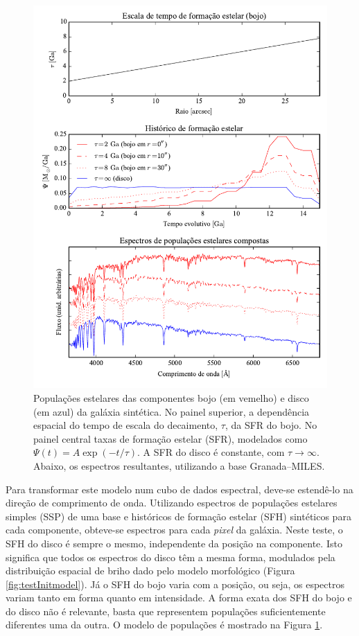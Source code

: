 \begin{figure}
	\includegraphics{figuras/simulation_popmodel}
	\caption[Modelos de populações estelares da galáxia sintética.]
	{Populações estelares das componentes bojo (em vemelho)
	e disco (em azul) da galáxia sintética. No painel superior, a dependência
	espacial do tempo de escala do decaimento, $\tau$, da SFR do bojo. No painel
	central taxas de formação estelar (SFR), modelados como $\Psi(t) = A \exp
	(-t/\tau)$. A SFR do disco é constante, com $\tau\to\infty$. Abaixo, os
	espectros resultantes, utilizando a base Granada--MILES.}
	\label{fig:testPopmodel}
\end{figure}

Para transformar este modelo num cubo de dados espectral, deve-se estendê-lo na
direção de comprimento de onda. Utilizando espectros de populações estelares
simples (SSP) de uma base e históricos de formação estelar (SFH) sintéticos
para cada componente, obteve-se espectros para cada {\em pixel} da galáxia. Neste
teste, o SFH do disco é sempre o mesmo, independente da posição na componente.
Isto significa que todos os espectros do disco têm a mesma forma, modulados pela
distribuição espacial de briho dado pelo modelo morfológico (Figura
\ref{fig:testInitmodel}). Já o SFH do bojo varia com a posição, ou seja, os
espectros variam tanto em forma quanto em intensidade. A forma exata dos SFH do
bojo e do disco não é relevante, basta que representem populações
suficientemente diferentes uma da outra. O modelo de populações é mostrado na
Figura \ref{fig:testPopmodel}.

